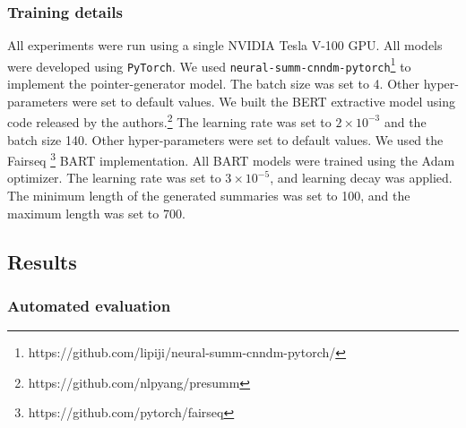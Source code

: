 \documentclass[letterpaper, table]{article} %
\begin{document}
\subsubsection{Training details}
All experiments were run using a single NVIDIA Tesla V-100 GPU. All models were developed using \texttt{PyTorch}. 
We used \texttt{neural-summ-cnndm-pytorch}\footnote{https://github.com/lipiji/neural-summ-cnndm-pytorch/} to implement the pointer-generator model. The batch size was set to 4. Other hyper-parameters were set to default values. We built the BERT extractive model using code released by the authors.\footnote{https://github.com/nlpyang/presumm} 
The learning rate was set to $2 \times 10^{-3}$ and the batch size 140. Other hyper-parameters were set to default values. We used the Fairseq \footnote{https://github.com/pytorch/fairseq} BART implementation. All BART models were trained using the Adam optimizer. The learning rate was set to $3 \times 10^{-5}$, and learning decay was applied. The minimum length of the generated summaries was set to 100, and the maximum length was set to 700.
\subsection{Results}
\subsubsection{Automated evaluation}
\end{document}
